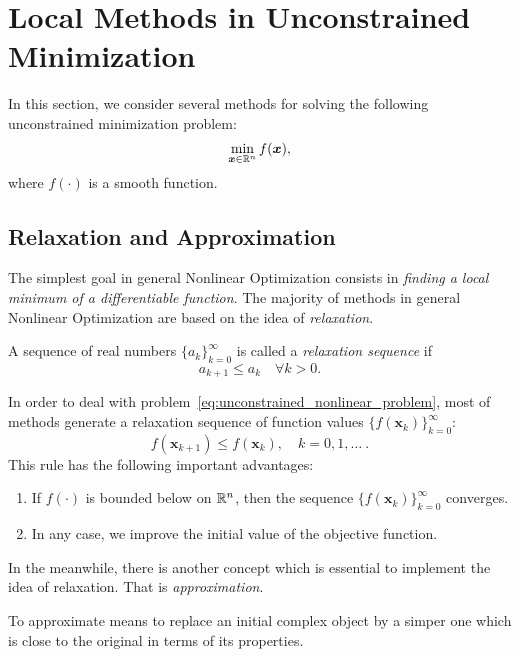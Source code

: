 \section{Local Methods in Unconstrained Minimization}\label{sec:local_methods_in_unconstrained_min}

In this section, we consider several methods for solving the following unconstrained minimization problem:
\begin{equation}\label{eq:unconstrained_nonlinear_problem}
    \min_{\bm{x} \in \mathbb{R}^n} f(\bm{x}),
\end{equation}
where \(f(\cdot)\) is a smooth function.

\subsection{Relaxation and Approximation}\label{subsec:relax_approx}

The simplest goal in general Nonlinear Optimization consists in \emph{finding a local minimum of a differentiable function}. 
The majority of methods in general Nonlinear Optimization are based on the idea of \emph{relaxation}.

\begin{defn}[Relaxation]\label{defn:relaxation}
    A sequence of real numbers \(\{ a_k \}_{k=0}^\infty\) is called a \emph{relaxation sequence} if 
    \[
        a_{k+1} \le a_k \quad \forall k > 0. 
    \]
\end{defn}

In order to deal with problem~\ref{eq:unconstrained_nonlinear_problem}, most of methods generate a relaxation sequence of function values \(\{ f(\bm{x}_k) \}_{k=0}^{\infty}\):
\[
    f(\bm{x}_{k+1}) \le f(\bm{x}_k), \quad k = 0, 1, \dots ~.  
\]
This rule has the following important advantages:
\begin{enumerate}
    \item If \(f(\cdot)\) is bounded below on \(\mathbb{R}^n\), then the sequence \(\{ f(\bm{x}_k) \}_{k=0}^{\infty}\) converges.
    \item In any case, we improve the initial value of the objective function.
\end{enumerate}

In the meanwhile, there is another concept which is essential to implement the idea of relaxation. That is \emph{approximation}.
\begin{defn}[Approximation]\label{defn:approx}
    To approximate means to replace an initial complex object by a simper one which is close to the original in terms of its properties.
\end{defn}

